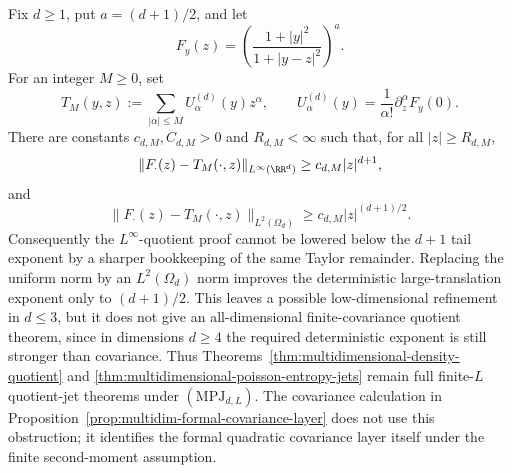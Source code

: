 \begin{proposition}%
\label{prop:multidim-large-translation-obstruction}
Fix \(d\ge1\), put \(a=(d+1)/2\), and let
\[
F_y(z)=
\left(\frac{1+|y|^2}{1+|y-z|^2}\right)^a .
\]
For an integer \(M\ge0\), set
\[
T_M(y,z):=\sum_{|\alpha|\le M}U_\alpha^{(d)}(y)z^\alpha,
\qquad
U_\alpha^{(d)}(y)=\frac1{\alpha!}\partial_z^\alpha F_y(0).
\]
There are constants \(c_{d,M},C_{d,M}>0\) and \(R_{d,M}<\infty\) such that,
for all \(|z|\ge R_{d,M}\),
\begin{equation}\label{eq:multidim-obstruction-linfty-lower}
\|F_\cdot(z)-T_M(\cdot,z)\|_{L^\infty(\RR^d)}
\ge c_{d,M}|z|^{d+1},
\end{equation}
and
\begin{equation}\label{eq:multidim-obstruction-l2-lower}
\|F_\cdot(z)-T_M(\cdot,z)\|_{L^2(\Omega_d)}
\ge c_{d,M}|z|^{(d+1)/2}.
\end{equation}
Consequently the \(L^\infty\)-quotient proof cannot be lowered below the
\(d+1\) tail exponent by a sharper bookkeeping of the same Taylor remainder.
Replacing the uniform norm by an \(L^2(\Omega_d)\) norm improves the
deterministic large-translation exponent only to \((d+1)/2\).  This leaves a
possible low-dimensional refinement in \(d\le3\), but it does not give an
all-dimensional finite-covariance quotient theorem, since in dimensions
\(d\ge4\) the required deterministic exponent is still stronger than
covariance.  Thus Theorems~\ref{thm:multidimensional-density-quotient} and
\ref{thm:multidimensional-poisson-entropy-jets} remain full finite-\(L\)
quotient-jet theorems under \((\mathrm{MPJ}_{d,L})\).  The covariance
calculation in Proposition~\ref{prop:multidim-formal-covariance-layer} does not
use this obstruction; it identifies the formal quadratic covariance layer
itself under the finite second-moment assumption.
\end{proposition}

